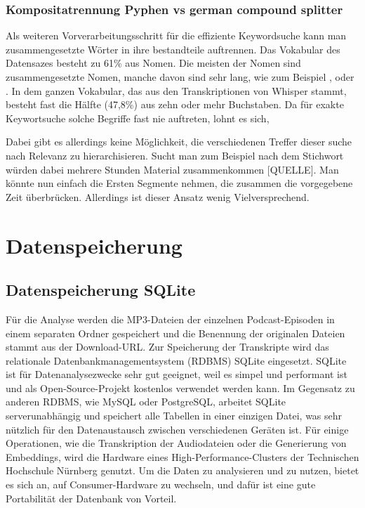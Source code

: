\subsubsection{Kompositatrennung Pyphen vs german compound splitter}

Als weiteren Vorverarbeitungsschritt für die effiziente Keywordsuche kann man zusammengesetzte Wörter in ihre bestandteile auftrennen.
Das Vokabular des Datensazes besteht zu 61\% aus Nomen. 
Die meisten der Nomen sind zusammengesetzte Nomen, manche davon sind sehr lang, wie zum Beispiel , oder .
In dem ganzen Vokabular, das aus den Transkriptionen von Whisper stammt, besteht fast die Hälfte (47,8\%) aus zehn oder mehr Buchstaben.
Da für exakte Keywortsuche solche Begriffe fast nie auftreten, lohnt es sich, 


Dabei gibt es allerdings keine Möglichkeit, die verschiedenen Treffer dieser suche nach Relevanz zu hierarchisieren. Sucht man zum Beispiel nach dem Stichwort  würden dabei mehrere Stunden Material zusammenkommen [QUELLE]. 
Man könnte nun einfach die Ersten Segmente nehmen, die zusammen die vorgegebene Zeit überbrücken. 
Allerdings ist dieser Ansatz wenig Vielversprechend. 




\section{Datenspeicherung}

\subsection{Datenspeicherung SQLite}

Für die Analyse werden die MP3-Dateien der einzelnen Podcast-Episoden in einem separaten Ordner gespeichert und die Benennung der originalen Dateien stammt aus der Download-URL.
Zur Speicherung der Transkripte wird das relationale Datenbankmanagementsystem (RDBMS) SQLite eingesetzt. 
SQLite ist für Datenanalysezwecke sehr gut geeignet, weil es simpel und performant ist und als Open-Source-Projekt kostenlos verwendet werden kann.
Im Gegensatz zu anderen RDBMS, wie MySQL oder PostgreSQL, arbeitet SQLite serverunabhängig und speichert alle Tabellen in einer einzigen Datei, was sehr nützlich für den Datenaustausch zwischen verschiedenen Geräten ist.
Für einige Operationen, wie die Transkription der Audiodateien oder die Generierung von Embeddings, wird die Hardware eines High-Performance-Clusters der Technischen Hochschule Nürnberg genutzt.
Um die Daten zu analysieren und zu nutzen, bietet es sich an, auf Consumer-Hardware zu wechseln, und dafür ist eine gute Portabilität der Datenbank von Vorteil.

